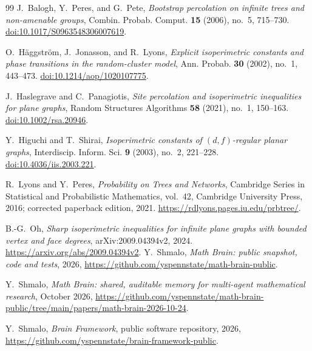 \documentclass[11pt]{amsart}
\numberwithin{equation}{section}
\theoremstyle{definition}
\theoremstyle{remark}
\begin{document}
\begin{thebibliography}{99}
J.~Balogh, Y.~Peres, and G.~Pete,
\emph{Bootstrap percolation on infinite trees and non-amenable groups},
Combin. Probab. Comput. \textbf{15} (2006), no.~5, 715--730.
\href{https://doi.org/10.1017/S0963548306007619}{doi:10.1017/S0963548306007619}.

O.~H\"aggstr\"om, J.~Jonasson, and R.~Lyons,
\emph{Explicit isoperimetric constants and phase transitions in the random-cluster model},
Ann. Probab. \textbf{30} (2002), no.~1, 443--473.
\href{https://doi.org/10.1214/aop/1020107775}{doi:10.1214/aop/1020107775}.

J.~Haslegrave and C.~Panagiotis,
\emph{Site percolation and isoperimetric inequalities for plane graphs},
Random Structures Algorithms \textbf{58} (2021), no.~1, 150--163.
\href{https://doi.org/10.1002/rsa.20946}{doi:10.1002/rsa.20946}.

Y.~Higuchi and T.~Shirai,
\emph{Isoperimetric constants of $(d,f)$-regular planar graphs},
Interdiscip. Inform. Sci. \textbf{9} (2003), no.~2, 221--228.
\href{https://doi.org/10.4036/iis.2003.221}{doi:10.4036/iis.2003.221}.

R.~Lyons and Y.~Peres,
\emph{Probability on Trees and Networks},
Cambridge Series in Statistical and Probabilistic Mathematics, vol.~42,
Cambridge University Press, 2016; corrected paperback edition, 2021.
\url{https://rdlyons.pages.iu.edu/prbtree/}.

B.-G.~Oh,
\emph{Sharp isoperimetric inequalities for infinite plane graphs with bounded vertex and face degrees},
arXiv:2009.04394v2, 2024.
\url{https://arxiv.org/abs/2009.04394v2}.
 Y.~Shmalo, \emph{Math Brain: public snapshot, code and tests}, 2026, \url{https://github.com/yspennstate/math-brain-public}.

 Y.~Shmalo, \emph{Math Brain: shared, auditable memory for multi-agent mathematical research}, October 2026, \url{https://github.com/yspennstate/math-brain-public/tree/main/papers/math-brain-2026-10-24}.

 Y.~Shmalo, \emph{Brain Framework}, public software repository, 2026, \url{https://github.com/yspennstate/brain-framework-public}.

\end{thebibliography}
\end{document}
